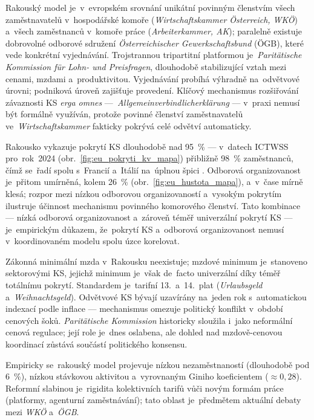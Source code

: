 
Rakouský model je~v~evropském srovnání unikátní povinným členstvím všech
zaměstnavatelů v~hospodářské komoře (\textit{Wirtschaftskammer Österreich, WKÖ})
a~všech zaměstnanců v~komoře práce (\textit{Arbeiterkammer, AK}); paralelně
existuje dobrovolné odborové sdružení \textit{Österreichischer Gewerkschaftsbund}
(ÖGB), které vede konkrétní vyjednávání.
Trojstrannou tripartitní platformou je~\textit{Paritätische Kommission für
Lohn- und Preisfragen}, dlouhodobě stabilizující vztah mezi cenami, mzdami
a~produktivitou. Vyjednávání probíhá výhradně na~odvětvové úrovni; podniková
úroveň zajišťuje provedení. Klíčový mechanismus rozšiřování závaznosti
\acs{KS} \emph{erga omnes} ---~\textit{Allgemeinverbindlicherklärung} ---
v~praxi nemusí být formálně využíván, protože povinné členství zaměstnavatelů
ve~\textit{Wirtschaftskammer} fakticky pokrývá celé odvětví automaticky.\par

Rakousko vykazuje pokrytí \acs{KS} dlouhodobě nad \SI{95}{\percent} ---
v~datech \acs{ICTWSS} pro~rok~2024 (obr.~\ref{fig:eu_pokryti_kv_mapa})
přibližně \SI{98}{\percent} zaměstnanců, čímž se~řadí spolu s~Francií
a~Itálií na~úplnou špici .
Odborová organizovanost je~přitom umírněná, kolem \SI{26}{\percent} (obr.~\ref{fig:eu_hustota_mapa}),
a~v~čase mírně klesá; rozpor mezi nízkou odborovou organizovaností a~vysokým pokrytím
ilustruje účinnost mechanismu povinného komorového členství.
Tato kombinace --- nízká odborová organizovanost a~zároveň téměř univerzální
pokrytí \acs{KS} --- je~empirickým důkazem, že~pokrytí \acs{KS} a~odborová
organizovanost nemusí v~koordinovaném modelu spolu úzce korelovat.\par

Zákonná minimální mzda v~Rakousku neexistuje; mzdové minimum je~stanoveno
sektorovými \acs{KS}, jejichž minimum je~však de~facto univerzální díky
téměř totálnímu pokrytí. Standardem je~tarifní 13.~a~14.~plat (\textit{Urlaubsgeld}
a~\textit{Weihnachtsgeld}). Odvětvové \acs{KS} bývají uzavírány na~jeden rok
s~automatickou indexací podle inflace --- mechanismus omezuje politický
konflikt v~období cenových šoků. \textit{Paritätische Kommission} historicky
sloužila i~jako neformální cenová regulace; její role je~dnes
oslabena, ale dohled nad mzdově-cenovou koordinací zůstává součástí
politického konsensu.\par

Empiricky se~rakouský model projevuje nízkou nezaměstnaností (dlouhodobě
pod \SI{6}{\percent}), nízkou stávkovou aktivitou a~vyrovnaným Giniho
koeficientem ($\approx 0{,}28$). Reformní slabinou je~rigidita kolektivních
tarifů vůči novým formám práce (platformy, agenturní zaměstnávání); tato
oblast je~předmětem aktuální debaty mezi \textit{WKÖ} a~\textit{ÖGB}.\par

